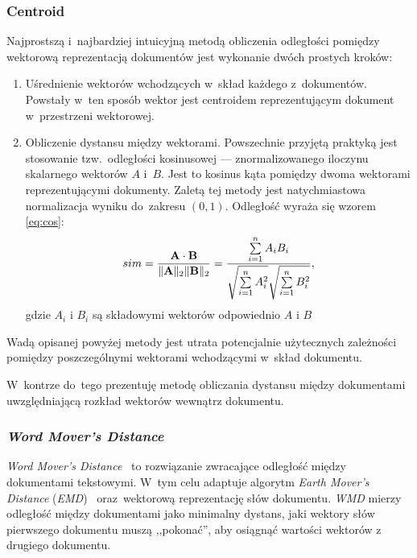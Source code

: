 \documentclass[pl]{minipw} %
\begin{document}
\subsubsection{Centroid}
Najprostszą i~najbardziej intuicyjną metodą obliczenia odległości pomiędzy wektorową reprezentacją dokumentów jest wykonanie dwóch prostych kroków:
\begin{enumerate}
	\item Uśrednienie wektorów wchodzących w~skład każdego z~dokumentów. Powstały w~ten sposób wektor jest centroidem reprezentującym dokument w~przestrzeni wektorowej.
	\item Obliczenie dystansu między wektorami. Powszechnie przyjętą praktyką jest stosowanie tzw.~odległości kosinusowej --- znormalizowanego iloczynu skalarnego wektorów $A$ i~$B$. Jest to kosinus kąta pomiędzy dwoma wektorami reprezentującymi dokumenty. Zaletą tej metody jest natychmiastowa normalizacja wyniku do~zakresu $(0, 1)$. Odległość wyraża się wzorem \ref{eq:cos}:
	\begin{equation}
	\label{eq:cos}
	sim={\mathbf {A} \cdot \mathbf {B}  \over \|\mathbf {A} \|_{2}\|\mathbf {B} \|_{2}}={\frac {\sum \limits _{i=1}^{n}{A_{i}B_{i}}}{{\sqrt {\sum \limits _{i=1}^{n}{A_{i}^{2}}}}{\sqrt {\sum \limits _{i=1}^{n}{B_{i}^{2}}}}}},
	\end{equation}
	gdzie $A_i$ i $B_i$ są składowymi wektorów odpowiednio $A$ i $B$
\end{enumerate}
Wadą opisanej powyżej metody jest utrata potencjalnie użytecznych zależności pomiędzy poszczególnymi wektorami wchodzącymi w~skład dokumentu.

W~kontrze do~tego prezentuję metodę obliczania dystansu między dokumentami uwzględniającą rozkład wektorów wewnątrz dokumentu.

\subsubsection{\textit{Word Mover's Distance}}
\textit{Word Mover's Distance}~\cite{wmd} to rozwiązanie zwracające odległość między dokumentami tekstowymi. W~tym celu adaptuje algorytm \textit{Earth Mover's Distance} (\textit{EMD})~\cite{emd} oraz~wektorową reprezentację słów dokumentu. \textit{WMD} mierzy odległość między dokumentami jako minimalny dystans, jaki wektory słów pierwszego dokumentu muszą ,,pokonać'', aby osiągnąć wartości wektorów z drugiego dokumentu.
\end{document}

